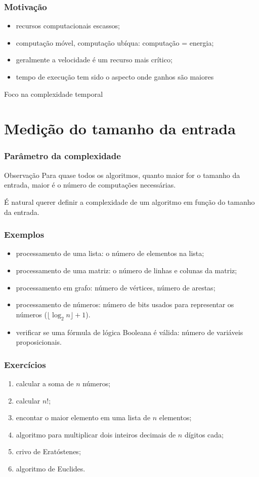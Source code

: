 \documentclass[handout]{beamer}
\begin{document}
\begin{frame}
  \frametitle{Motivação}

  \begin{itemize}
  \item recursos computacionais escassos;
  \item computação móvel, computação ubíqua: computação = energia;
  \item geralmente a velocidade é um recurso mais crítico;
  \item tempo de execução tem sido o aspecto onde ganhos são maiores
  \end{itemize}
  \pause
  \alert{Foco na complexidade temporal}
\end{frame}

\section{Medição do tamanho da entrada}

\begin{frame}
\frametitle{Parâmetro da complexidade}

\begin{block}{Observação}
Para quase todos os algoritmos, quanto maior for o tamanho da entrada, maior
é o número de computações necessárias.
\end{block}

É natural querer definir a complexidade de um algoritmo em função do tamanho da
entrada.
\end{frame}

\begin{frame}
\frametitle{Exemplos}

\begin{itemize}
\item processamento de uma lista: o número de elementos na lista;
\item processamento de uma matriz: o número de linhas e colunas da matriz;
\item processamento em grafo: número de vértices, número de arestas;
\item processamento de números: número de bits usados para representar os
  números ($\lfloor \log_2 n \rfloor + 1$).
\item verificar se uma fórmula de lógica Booleana é válida: número de variáveis
  proposicionais.
\end{itemize}

\end{frame}

\begin{frame}
\frametitle{Exercícios}
\begin{enumerate}
\item calcular a soma de $n$ números;
\item calcular $n!$;
\item encontar o maior elemento em uma lista de $n$ elementos;
\item algoritmo para multiplicar dois inteiros decimais de $n$ dígitos cada;
\item crivo de Eratóstenes;
\item algoritmo de Euclides.
\end{enumerate}
\end{frame}
\end{document}
